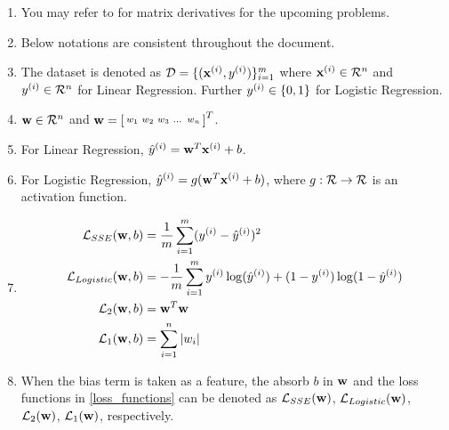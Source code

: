 \begin{enumerate}
\item 
You may refer to \cite{Petersen2012} for matrix derivatives for the upcoming problems.
\item Below notations are consistent throughout the document.
\item The dataset is denoted as $\mathcal{D} = \{(\mathbf{x}^{(i)}, y^{(i)})\}_{i = 1}^{m}$ where $\mathbf{x}^{(i)} \in \mathcal{R}^{n}$ and $y^{(i)} \in \mathcal{R}^{n}$ for Linear Regression. Further $y^{(i)} \in \{0, 1\}$ for Logistic Regression.
\item $\mathbf{w} \in \mathcal{R}^n$ and $\mathbf{w} = \left[ \begin{smallmatrix} w_1 & w_2 & w_3 & \dots & w_n \end{smallmatrix} \right]^T$.
\item For Linear Regression,  $\hat{y}^{(i)} =  \mathbf{w}^T \mathbf{x}^{(i)} + b$.
\item For Logistic Regression,  $\hat{y}^{(i)} =  g(\mathbf{w}^T \mathbf{x}^{(i)} + b)$, where $g: \mathcal{R} \to \mathcal{R}$ is an activation function.
\item  \label{loss_functions}
\begin{align*}
\mathcal{L}_{SSE}(\mathbf{w}, b) &= \frac{1}{m}\sum_{i = 1}^{m}(y^{(i)} - \hat{y}^{(i)})^2\\
\mathcal{L}_{Logistic}(\mathbf{w}, b) &= -\frac{1}{m}\sum_{i = 1}^{m} y^{(i)}\log(\hat{y}^{(i)}) + (1 - y^{(i)})\log(1 - \hat{y}^{(i)})\\ 
\mathcal{L}_2(\mathbf{w},b) &= \mathbf{w}^T\mathbf{w}\\
\mathcal{L}_1(\mathbf{w},b) &= \sum_{i = 1}^{n} |w_i|\\
\end{align*}

\item When the bias term is taken as a feature, the absorb $b$ in $\mathbf{w}$ and the loss functions in \autoref{loss_functions} can be denoted as $\mathcal{L}_{SSE}(\mathbf{w})$, $\mathcal{L}_{Logistic}(\mathbf{w})$, $\mathcal{L}_2(\mathbf{w})$, $\mathcal{L}_1(\mathbf{w})$, respectively.
\end{enumerate}